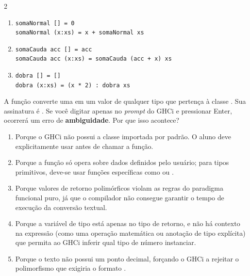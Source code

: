 \documentclass[a4paper,10pt,brazil]{article}
\begin{document}
\begin{multicols}{2}
\begin{enumerate}
  \item \begin{verbatim}
somaNormal [] = 0
somaNormal (x:xs) = x + somaNormal xs
\end{verbatim}

  \item \begin{verbatim}
somaCauda acc [] = acc
somaCauda acc (x:xs) = somaCauda (acc + x) xs
\end{verbatim}

  \item \begin{verbatim}
dobra [] = []
dobra (x:xs) = (x * 2) : dobra xs
\end{verbatim}


\end{enumerate}

A função  converte uma  em um valor de qualquer tipo que pertença à classe . Sua assinatura é . 
Se você digitar apenas  no \emph{prompt} do GHCi e pressionar Enter, ocorrerá um erro de \textbf{ambiguidade}. Por que isso acontece?

\begin{enumerate}
  \item Porque o GHCi não possui a classe  importada por padrão. O aluno deve explicitamente usar  antes de chamar a função.

  \item Porque a função  só opera sobre dados definidos pelo usuário; para tipos primitivos, deve-se usar funções específicas como  ou .

  \item Porque valores de retorno polimórficos violam as regras do paradigma funcional puro, já que o compilador não consegue garantir o tempo de execução da conversão textual.

  \item Porque a variável de tipo  está apenas no tipo de retorno, e não há contexto na expressão (como uma operação matemática ou anotação de tipo explícita) que permita ao GHCi inferir qual tipo de número instanciar.

  \item Porque o texto  não possui um ponto decimal, forçando o GHCi a rejeitar o polimorfismo que exigiria o formato .



\end{enumerate}
\end{multicols}
\end{document}
